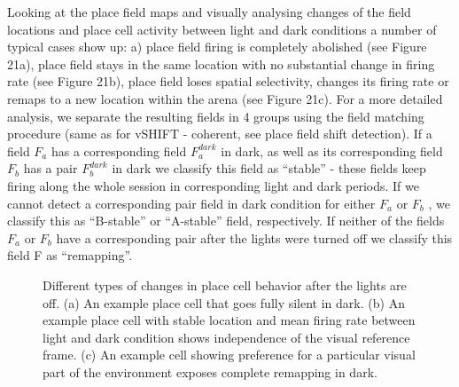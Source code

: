 Looking at the place field maps and visually analysing changes of the field locations and place cell activity between light and dark conditions a number of typical cases show up: a) place field firing is completely abolished (see Figure 21a), place field stays in the same location with no substantial change in firing rate (see Figure 21b), place field loses spatial selectivity, changes its firing rate or remaps to a new location within the arena (see Figure 21c). For a more detailed analysis, we separate the resulting fields in 4 groups using the field matching procedure (same as for vSHIFT - coherent, see place field shift detection). If a field $F_a$ has a corresponding field $F_a^{dark}$ in dark, as well as its corresponding field $F_b$ has a pair $F_b^{dark}$ in dark we classify this field as “stable” - these fields keep firing along the whole session in corresponding light and dark periods. If we cannot detect a corresponding pair field in dark condition for either $F_a$ or $F_b$ , we classify this as “B-stable” or “A-stable” field, respectively. If neither of the fields $F_a$ or $F_b$ have a corresponding pair after the lights were turned off we classify this field F as “remapping”.

\begin{figure}
\captionsetup{format=plain}
\caption[Remapping in darkness]{
Different types of changes in place cell behavior after the lights are off. (a) An example place cell that goes fully silent in dark. (b) An example place cell with stable location and mean firing rate between light and dark condition shows independence of the visual reference frame. (c) An example cell showing preference for a particular visual part of the environment exposes complete remapping in dark.
}
\label{fig:F21_remapping_types}
\end{figure}

